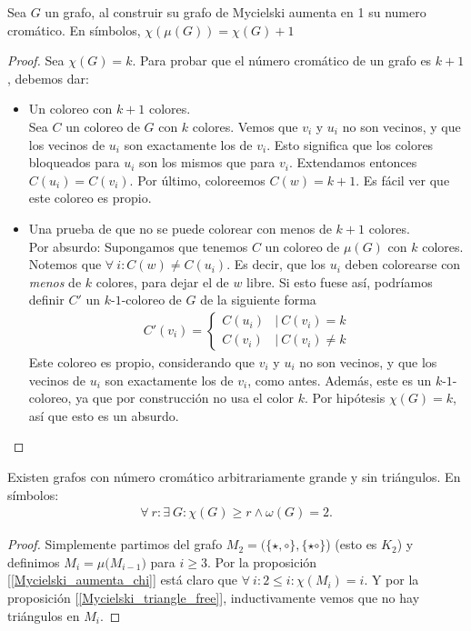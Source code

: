 \begin{proposition}\label{Mycielski_aumenta_chi}
Sea $G$ un grafo, al construir su grafo de Mycielski aumenta en 1 su numero cromático. En símbolos,
$\chi({\mu(G)}) = \chi(G) + 1$
\end{proposition}

\begin{proof}
Sea $\chi(G) = k$. Para probar que el número cromático de un grafo es $k+1$, debemos dar:
\begin{itemize}
    \item Un coloreo con $k+1$ colores.\\
    Sea $C$ un coloreo de $G$ con $k$ colores. Vemos que $v_i$ y $u_i$ no son vecinos, y que los vecinos de $u_i$ son exactamente los de $v_i$. Esto significa que los colores bloqueados para $u_i$ son los mismos que para $v_i$. Extendamos entonces $C(u_i) = C(v_i)$. Por último, coloreemos $C(w) = k+1$. Es fácil ver que este coloreo es propio.
    
    \item Una prueba de que no se puede colorear con menos de $k+1$ colores.\\
    Por absurdo: Supongamos que tenemos $C$ un coloreo de $\mu(G)$ con $k$ colores. Notemos que $\forall~ i\colon C(w) \neq C(u_i)$. Es decir, que los $u_i$ deben colorearse con \emph{menos} de $k$ colores, para dejar el de $w$ libre. Si esto fuese así, podríamos definir $C'$ un $k$-$1$-coloreo de $G$ de la siguiente forma
    \begin{align}
           C'(v_i) =
        \begin{cases}
            C(u_i) & |\ C(v_i) = k\\
            C(v_i) & |\ C(v_i) \neq k
        \end{cases}
    \end{align}
    Este coloreo es propio, considerando que $v_i$ y $u_i$ no son vecinos, y que los vecinos de $u_i$ son exactamente los de $v_i$, como antes.
    Además, este es un $k$-$1$-coloreo, ya que por construcción no usa el color $k$. Por hipótesis $\chi(G) = k$, así que esto es un absurdo.
\end{itemize}
\end{proof}

\begin{proposition}
Existen grafos con número cromático arbitrariamente grande y sin triángulos. En símbolos:
\begin{align}
    \forall~ r\colon \exists~ G\colon \chi(G) \ge r \wedge \omega(G) = 2.
\end{align}
\end{proposition}

\begin{proof}
Simplemente partimos del grafo $M_2 = (\{\star, \circ\}, \{\star\circ\}$) (esto es $K_2$) y definimos $M_i = \mu({M_{i-1})}$ para $i \ge 3$. Por la proposición [\ref{Mycielski_aumenta_chi}] está claro que $\forall~ i\colon 2 \le i : \chi(M_i) = i$. Y por la proposición [\ref{Mycielski_triangle_free}], inductivamente vemos que no hay triángulos en $M_i$.
\end{proof}
